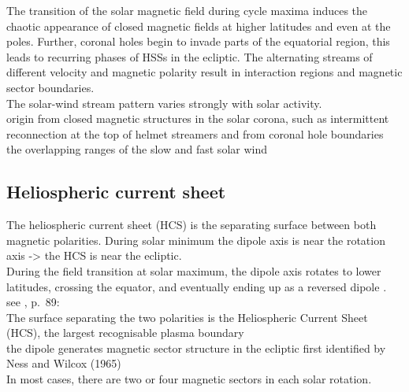 The transition of the solar magnetic field during cycle maxima induces the chaotic appearance of closed magnetic fields at higher latitudes and even at the poles. Further, coronal holes begin to invade parts of the equatorial region, this leads to recurring phases of HSSs in the ecliptic.
The alternating streams of different velocity and magnetic polarity result in interaction regions and magnetic sector boundaries.\\

The solar-wind stream pattern varies strongly with solar activity.\\

origin from closed magnetic structures in the solar corona, such as intermittent reconnection at the top of helmet streamers and from coronal hole boundaries \citep{Kilpua2016}\\

the overlapping ranges of the slow and fast solar wind \citep{McGregor2011a}\\


\subsection{Heliospheric current sheet}

The heliospheric current sheet (HCS) is the separating surface between both magnetic polarities. During solar minimum the dipole axis is near the rotation axis -> the HCS is near the ecliptic.\\
During the field transition at solar maximum, the dipole axis rotates to lower latitudes, crossing the equator, and eventually ending up as a reversed dipole \citep{Jones2003}.\\




see \citet{Balogh2009}, p.~89:\\
The surface separating the two polarities is the Heliospheric Current Sheet (HCS), the largest recognisable plasma boundary\\

the dipole generates magnetic sector structure in the ecliptic first identified by Ness and Wilcox (1965)\\
In most cases, there are two or four magnetic sectors in each solar rotation.\\

